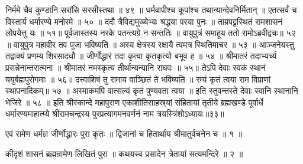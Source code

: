 निर्ममे चैव कुण्डानि सरांसि सरसीस्तथा ॥ ४९ ॥
धर्मवापीश्च कूपांश्च तथान्यान्देवनिर्मितान् ॥
एतत्सर्वं च विस्तार्य धर्मारण्ये मनोरमे ॥ ५० ॥
ददौ त्रैविद्यमुख्येभ्यः श्रद्धया परया पुनः ॥
ताम्रपट्टस्थितं रामशासनं लोपयेत्तु यः ॥ ५१॥
पूर्वजास्तस्य नरके पतन्त्यग्रे न सन्ततिः ॥
वायुपुत्रं समाहूय ततो रामोऽब्रवीद्वचः॥ ५२ ॥
वायुपुत्र महावीर तव पूजा भविष्यति ॥
अस्य क्षेत्रस्य रक्षायै त्वमत्र स्थितिमाचर ॥ ५३ ॥
आञ्जनेयस्तु तद्वाक्यं प्रणम्य शिरसादधौ ॥
जीर्णोद्धारं तदा कृत्वा कृतकृत्यो बभूव ह ॥ ५४ ॥
श्रीमातरं तदाभ्यर्च्य प्रसन्नेनान्तरात्मना ॥
श्रीमातरं नमस्कृत्य तीर्थान्यन्यानि राघवः ॥ ५५॥
तेऽपि देवाः स्वकं स्थानं ययुर्बह्मपुरोगमाः ॥ ५६॥
दत्त्वाशिषं तु रामाय वाञ्छितं ते भविष्यति ॥
रम्यं कृतं त्वया राम विप्राणां स्थापनादिकम्॥ ५७ ॥
अस्माकमपि वात्सल्यं कृतं पुण्यवता त्वया ॥
इति स्तुवन्तस्ते देवाः स्वानि स्थानानि भेजिरे ॥ ५८ ॥
इति श्रीस्कान्दे महापुराण एकाशीतिसाहस्र्यां संहितायां तृतीये ब्रह्मखण्डे पूर्वार्धे धर्मारण्यमाहात्म्ये श्रीरामचन्द्रस्य पुरप्रत्यागमनवर्णनं नाम त्रयस्त्रिंशोऽध्यायः॥३३॥



एवं रामेण धर्मज्ञ जीर्णोद्धारः पुरा कृतः ॥
द्विजानां च हितार्थाय श्रीमातुर्वचनेन च ॥ १ ॥

कीदृशं शासनं ब्रह्मन्रामेण लिखितं पुरा ॥
कथयस्व प्रसादेन त्रेतायां सत्यमन्दिरे ॥ २ ॥


